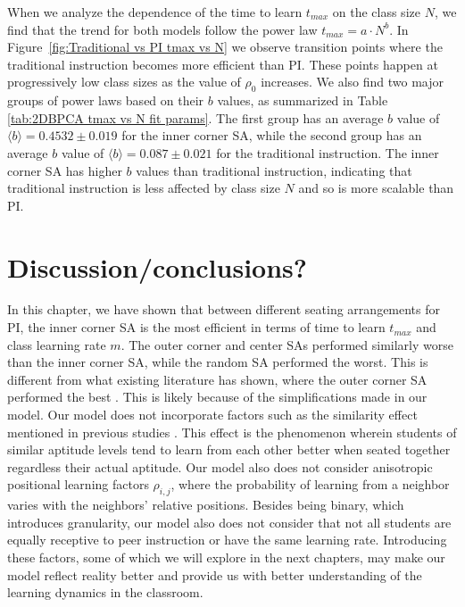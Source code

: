 When we analyze the dependence of the time to learn $t_{max}$ on the class size $N$, we find that the trend for both models follow the power law $t_{max} = a \cdot N^b$. 
In Figure~\ref{fig:Traditional vs PI tmax vs N} we observe transition points where the traditional instruction becomes more efficient than PI. 
These points happen at progressively low class sizes as the value of $\rho_0$ increases. 
We also find two major groups of power laws based on their $b$ values, as summarized in Table \ref{tab:2DBPCA tmax vs N fit params}. 
The first group has an average $b$ value of $\langle b \rangle = 0.4532 \pm 0.019$ for the inner corner SA, while the second group has an average $b$ value of $\langle b \rangle = 0.087\pm0.021$ for the traditional instruction. 
The inner corner SA has higher $b$ values than traditional instruction, indicating that traditional instruction is less affected by class size $N$ and so is more scalable than PI.

\section{Discussion/conclusions?}
In this chapter, we have shown that between different seating arrangements for PI, the inner corner SA is the most efficient in terms of time to learn $t_{max}$ and class learning rate $m$. 
The outer corner and center SAs performed similarly worse than the inner corner SA, while the random SA performed the worst. 
This is different from what existing literature has shown, where the outer corner SA performed the best \cite{roxas2010seating}. 
This is likely because of the simplifications made in our model. 
Our model does not incorporate factors such as the similarity effect mentioned in previous studies \cite{roxas2010seating,smith2009peer}. 
This effect is the phenomenon wherein students of similar aptitude levels tend to learn from each other better when seated together regardless their actual aptitude. 
Our model also does not consider anisotropic positional learning factors $\rho_{i,j}$, where the probability of learning from a neighbor varies with the neighbors' relative positions. 
Besides being binary, which introduces granularity, our model also does not consider that not all students are equally receptive to peer instruction or have the same learning rate. 
Introducing these factors, some of which we will explore in the next chapters, may make our model reflect reality better and provide us with better understanding of the learning dynamics in the classroom.

